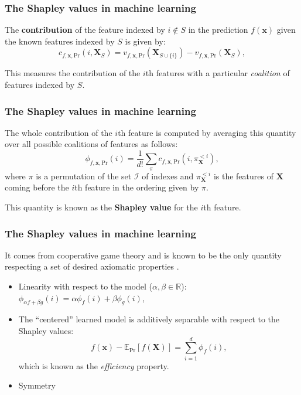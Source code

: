 \documentclass{beamer}
\begin{document}
\begin{frame}
\frametitle{The Shapley values in machine learning}
  
The \textbf{contribution} of the feature indexed by $i \notin S$ in the prediction $f(\bm{x})$ given the known features indexed by $S$ is given by:
\begin{equation}
  \label{eq:contrib}
  c_{f,\bm{x},\text{Pr}}(i,\bm{X}_S) = v_{f,\bm{x},\text{Pr}}(\bm{X}_{S\cup\{i\}}) - v_{f,\bm{x},\text{Pr}}(\bm{X}_S),
\end{equation}

This measures the contribution of the $i$th features with a particular \emph{coalition} of features indexed by $S$.
\end{frame}

\begin{frame}
  \frametitle{The Shapley values in machine learning}
  
 The whole contribution of the $i$th feature is computed by averaging this quantity over all possible coalitions of features as follows:
\begin{equation}
  \phi_{f,\bm{x},\text{Pr}}(i) = \frac{1}{d!} \sum_{\pi}c_{f,\bm{x},\text{Pr}}(i,\pi^{<i}_{\bm{X}}),
\end{equation}
where $\pi$ is a permutation of the set $\mathcal{I}$ of indexes and $\pi^{<i}_{\bm{X}}$ is the features of $\bm{X}$ coming before the $i$th feature in the ordering given by $\pi$.
\pause
\begin{center}
  This quantity is known as the {\Large\textbf{Shapley value}} for the $i$th feature.
\end{center}

\end{frame}

\begin{frame}
  \frametitle{The Shapley values in machine learning}
  
  It comes from cooperative game theory and is known to be the only quantity respecting a set of desired axiomatic properties .
  \begin{itemize}
    \pause
\item Linearity with respect to the model ($\alpha, \beta \in \mathbb{R}$): $\phi_{\alpha f +\beta g}(i) = \alpha \phi_f(i) + \beta \phi_g(i)$,
    \pause
\item The ``centered'' learned model is additively separable with respect to the Shapley values:
\begin{equation}
  f(\bm{x})-\mathbb{E}_{\text{Pr}}[f(\bm{X})] = \sum_{i=1}^{d} \phi_f(i),
\end{equation}
which is known as the \emph{efficiency} property.
    \pause
\item Symmetry
\end{itemize}

\end{frame}
\end{document}
